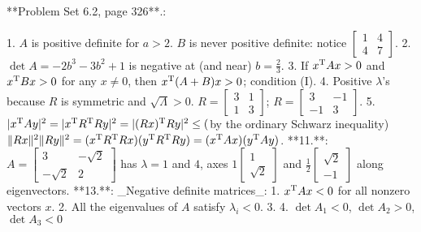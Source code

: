 **Problem Set 6.2, page 326**.:

1. \(A\) is positive definite for \(a>2\). \(B\) is never positive definite: notice \(\begin{bmatrix}1&4\\ 4&7\end{bmatrix}\).
2. \(\det A=-2b^{3}-3b^{2}+1\) is negative at (and near) \(b=\frac{2}{3}\).
3. If \(x^{\rm T}Ax>0\) and \(x^{\rm T}Bx>0\) for any \(x\neq 0\), then \(x^{\rm T}(A+B)x>0\); condition (I).
4. Positive \(\lambda\)'s because \(R\) is symmetric and \(\sqrt{\Lambda}>0\). \(R=\begin{bmatrix}3&1\\ 1&3\end{bmatrix}\); \(R=\begin{bmatrix}3&-1\\ -1&3\end{bmatrix}\).
5. \(|x^{\rm T}Ay|^{2}=|x^{\rm T}R^{\rm T}Ry|^{2}=|(Rx)^{\rm T}Ry|^{2}\leq(\)by the ordinary Schwarz inequality) \(\|Rx\|^{2}\|Ry\|^{2}=(x^{\rm T}R^{\rm T}Rx)(y^{\rm T}R^{\rm T}Ry)=(x^{\rm T}Ax) (y^{\rm T}Ay)\).
**11.**: \(A=\begin{bmatrix}3&-\sqrt{2}\\ -\sqrt{2}&2\end{bmatrix}\) has \(\lambda=1\) and \(4\), axes \(1\begin{bmatrix}1\\ \sqrt{2}\end{bmatrix}\) and \(\frac{1}{2}\begin{bmatrix}\sqrt{2}\\ -1\end{bmatrix}\) along eigenvectors.
**13.**: _Negative definite matrices_: 1. \(x^{\rm T}Ax<0\) for all nonzero vectors \(x\). 2. All the eigenvalues of \(A\) satisfy \(\lambda_{i}<0\). 3. 4. \(\det A_{1}<0\), \(\det A_{2}>0\), \(\det A_{3}<0\)